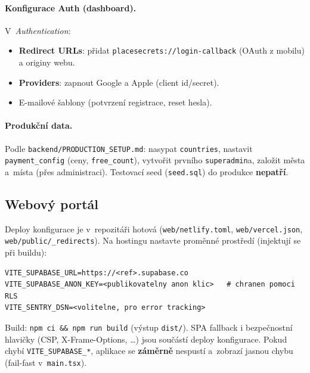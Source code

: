 \documentclass[11pt,a4paper]{article}
\newcommand{\code}[1]{\texttt{#1}}
\begin{document}
\paragraph{Konfigurace Auth (dashboard).} V~\emph{Authentication}:
\begin{itemize}[nosep]
  \item \textbf{Redirect URLs}: přidat \code{placesecrets://login-callback} (OAuth z mobilu) a originy webu.
  \item \textbf{Providers}: zapnout Google a Apple (client id/secret).
  \item E-mailové šablony (potvrzení registrace, reset hesla).
\end{itemize}

\paragraph{Produkční data.} Podle \code{backend/PRODUCTION\_SETUP.md}: nasypat
\code{countries}, nastavit \code{payment\_config} (ceny, \code{free\_count}),
vytvořit prvního \code{superadmin}a, založit města a~místa (přes administraci).
Testovací seed (\code{seed.sql}) do produkce \textbf{nepatří}.

\subsection{Webový portál}
Deploy konfigurace je v~repozitáři hotová (\code{web/netlify.toml},
\code{web/vercel.json}, \code{web/public/\_redirects}). Na hostingu nastavte
proměnné prostředí (injektují se při buildu):
\begin{lstlisting}
VITE_SUPABASE_URL=https://<ref>.supabase.co
VITE_SUPABASE_ANON_KEY=<publikovatelny anon klic>   # chranen pomoci RLS
VITE_SENTRY_DSN=<volitelne, pro error tracking>
\end{lstlisting}
Build: \code{npm ci \&\& npm run build} (výstup \code{dist/}). SPA fallback i
bezpečnostní hlavičky (CSP, X-Frame-Options, \dots) jsou součástí deploy konfigurace.
Pokud chybí \code{VITE\_SUPABASE\_*}, aplikace se \textbf{záměrně} nespustí a~zobrazí
jasnou chybu (fail-fast v~\code{main.tsx}).
\end{document}
